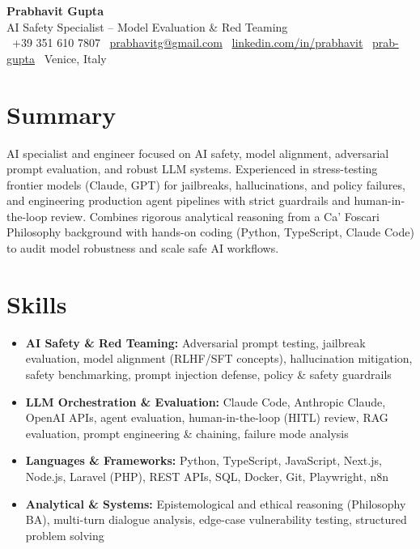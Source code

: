 \documentclass[a4paper,10pt]{article}
\begin{document}
\begin{center}
 {\Huge\bfseries Prabhavit Gupta}\\[2pt]
 {\color{accent}\large AI Safety Specialist -- Model Evaluation \& Red Teaming}\\[4pt]
 \faPhone\ +39 351 610 7807 \quad
 \faEnvelope\ \href{mailto:prabhavitg@gmail.com}{prabhavitg@gmail.com} \quad
 \faLinkedin\ \href{https://www.linkedin.com/in/prabhavit/}{linkedin.com/in/prabhavit} \quad
 \faGithub\ \href{https://github.com/prab-gupta}{prab-gupta} \quad
 \faMapMarker*\ Venice, Italy
\end{center}

\section{Summary}
AI specialist and engineer focused on AI safety, model alignment, adversarial prompt evaluation, and robust LLM systems. Experienced in stress-testing frontier models (Claude, GPT) for jailbreaks, hallucinations, and policy failures, and engineering production agent pipelines with strict guardrails and human-in-the-loop review. Combines rigorous analytical reasoning from a Ca' Foscari Philosophy background with hands-on coding (Python, TypeScript, Claude Code) to audit model robustness and scale safe AI workflows.

\section{Skills}
\begin{itemize}
 \item \textbf{AI Safety \& Red Teaming:} Adversarial prompt testing, jailbreak evaluation, model alignment (RLHF/SFT concepts), hallucination mitigation, safety benchmarking, prompt injection defense, policy \& safety guardrails
 \item \textbf{LLM Orchestration \& Evaluation:} Claude Code, Anthropic Claude, OpenAI APIs, agent evaluation, human-in-the-loop (HITL) review, RAG evaluation, prompt engineering \& chaining, failure mode analysis
 \item \textbf{Languages \& Frameworks:} Python, TypeScript, JavaScript, Next.js, Node.js, Laravel (PHP), REST APIs, SQL, Docker, Git, Playwright, n8n
 \item \textbf{Analytical \& Systems:} Epistemological and ethical reasoning (Philosophy BA), multi-turn dialogue analysis, edge-case vulnerability testing, structured problem solving
\end{itemize}
\end{document}
